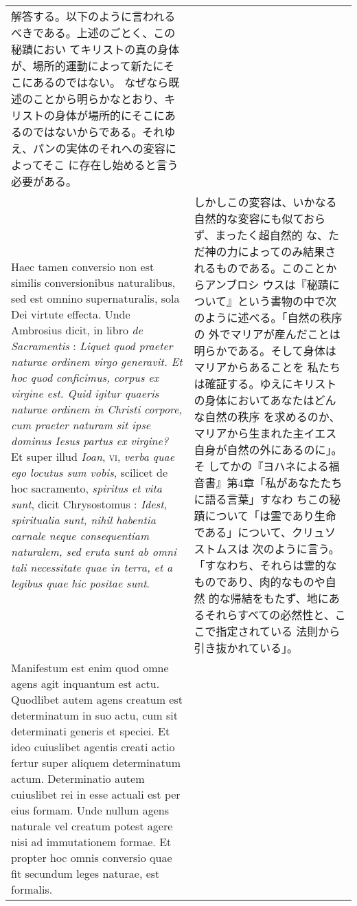 \documentclass[10pt]{jsarticle} %
\begin{document}
\begin{longtable}{p{21em}p{21em}}
解答する。以下のように言われるべきである。上述のごとく、この秘蹟におい
てキリストの真の身体が、場所的運動によって新たにそこにあるのではない。
なぜなら既述のことから明らかなとおり、キリストの身体が場所的にそこにあ
るのではないからである。それゆえ、パンの実体のそれへの変容によってそこ
に存在し始めると言う必要がある。


\\



Haec tamen conversio non est similis conversionibus naturalibus, sed
est omnino supernaturalis, sola Dei virtute effecta. Unde Ambrosius
dicit, in libro {\itshape de Sacramentis} : {\itshape Liquet quod
praeter naturae ordinem virgo generavit. Et hoc quod conficimus,
corpus ex virgine est. Quid igitur quaeris naturae ordinem in Christi
corpore, cum praeter naturam sit ipse dominus Iesus partus ex
virgine?} Et super illud {\itshape Ioan}, {\scshape vi}, {\itshape
verba quae ego locutus sum vobis}, scilicet de hoc sacramento,
{\itshape spiritus et vita sunt}, dicit Chrysostomus : {\itshape
Idest, spiritualia sunt, nihil habentia carnale neque consequentiam
naturalem, sed eruta sunt ab omni tali necessitate quae in terra, et a
legibus quae hic positae sunt}.

&

しかしこの変容は、いかなる自然的な変容にも似ておらず、まったく超自然的
な、ただ神の力によってのみ結果されるものである。このことからアンブロシ
ウスは『秘蹟について』という書物の中で次のように述べる。「自然の秩序の
外でマリアが産んだことは明らかである。そして身体はマリアからあることを
私たちは確証する。ゆえにキリストの身体においてあなたはどんな自然の秩序
を求めるのか、マリアから生まれた主イエス自身が自然の外にあるのに」。そ
してかの『ヨハネによる福音書』第4章「私があなたたちに語る言葉」すなわ
ちこの秘蹟について「は霊であり生命である」について、クリュソストムスは
次のように言う。「すなわち、それらは霊的なものであり、肉的なものや自然
的な帰結をもたず、地にあるそれらすべての必然性と、ここで指定されている
法則から引き抜かれている」。


\\



Manifestum est enim quod omne agens agit inquantum est actu. Quodlibet
autem agens creatum est determinatum in suo actu, cum sit determinati
generis et speciei. Et ideo cuiuslibet agentis creati actio fertur
super aliquem determinatum actum. Determinatio autem cuiuslibet rei in
esse actuali est per eius formam. Unde nullum agens naturale vel
creatum potest agere nisi ad immutationem formae.  Et propter hoc
omnis conversio quae fit secundum leges naturae, est formalis.  &


\end{longtable}
\end{document}
